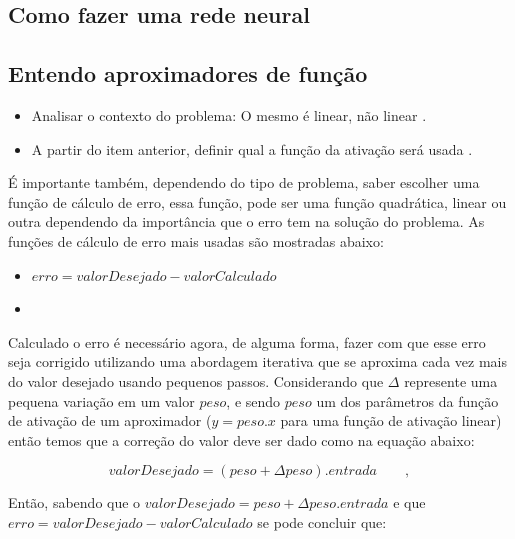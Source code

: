 \begin{apendicesenv}
	\chapter{Como fazer uma rede neural}
	
	\section{Entendo aproximadores de função}
		\begin{itemize}
			\item Analisar o contexto do problema: O mesmo é linear, não linear \cite{rashid2016make}.
			\item A partir do item anterior, definir qual a função da ativação será usada \cite{rashid2016make}.
		\end{itemize}
	
		\par É importante também, dependendo do tipo de problema, saber escolher uma função de cálculo de erro, essa função, pode ser uma função quadrática, linear ou outra dependendo da importância que o erro tem na solução do problema. As funções de cálculo de erro mais usadas são mostradas abaixo:
		
		\begin{itemize}
			\item $erro = valorDesejado - valorCalculado$
			\item 
		\end{itemize}
	
		\par Calculado o erro é necessário agora, de alguma forma, fazer com que esse erro seja corrigido utilizando uma abordagem iterativa que se aproxima cada vez mais do valor desejado usando pequenos passos. Considerando que $\Delta$ represente uma pequena variação em um valor $peso$, e sendo  $peso$ um dos parâmetros da função de ativação de um aproximador ($y = peso . x$ para uma função de ativação linear) então temos que a correção do valor deve ser dado como na equação abaixo:
		
		\begin{equation}
			valorDesejado = (peso + \Delta peso) . entrada \qquad,
		\end{equation}
		\cite{rashid2016make}
		
		\par Então, sabendo que o $valorDesejado = peso + \Delta peso . entrada$ e que $erro = valorDesejado - valorCalculado$ se pode concluir que:
		

\end{apendicesenv}
